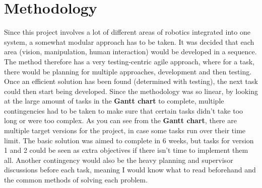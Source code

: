 \section{Methodology}
Since this project involves a lot of different areas of robotics integrated into one system, a somewhat modular approach has to be taken. It was decided that each area (vision, manipulation, human interaction) would be developed in a sequence. The method therefore has a very testing-centric agile approach, where for a task, there would be planning for multiple approaches, development and then testing. Once an efficient solution has been found (determined with testing), the next task could then start being developed. Since the methodology was so linear, by looking at the large amount of tasks in the \textbf{Gantt chart} to complete, multiple contingencies had to be taken to make sure that certain tasks didn't take too long or were too complex.\newline\newline
As you can see from the \textbf{Gantt chart}, there are multiple target versions for the project, in case some tasks run over their time limit. The basic solution was aimed to complete in 6 weeks, but tasks for version 1 and 2 could be seen as extra objectives if there isn't time to implement them all. Another contingency would also be the heavy planning and supervisor discussions before each task, meaning I would know what to read beforehand and the common methods of solving each problem.
